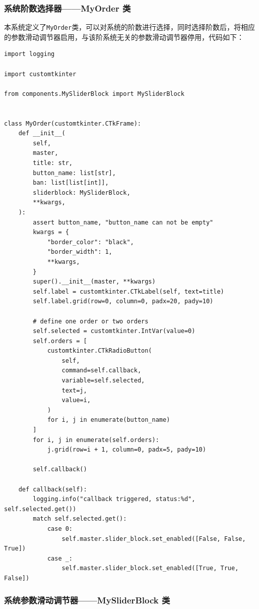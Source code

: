 \documentclass[12pt]{ctexart}
\begin{document}
\subsubsection{系统阶数选择器——MyOrder 类}

本系统定义了\texttt{MyOrder}类，可以对系统的阶数进行选择，同时选择阶数后，将相应的参数滑动调节器启用，与该阶系统无关的参数滑动调节器停用，代码如下：

\begin{lstlisting}[title=MyOrder 类代码]
import logging

import customtkinter

from components.MySliderBlock import MySliderBlock


class MyOrder(customtkinter.CTkFrame):
    def __init__(
        self,
        master,
        title: str,
        button_name: list[str],
        ban: list[list[int]],
        sliderblock: MySliderBlock,
        **kwargs,
    ):
        assert button_name, "button_name can not be empty"
        kwargs = {
            "border_color": "black",
            "border_width": 1,
            **kwargs,
        }
        super().__init__(master, **kwargs)
        self.label = customtkinter.CTkLabel(self, text=title)
        self.label.grid(row=0, column=0, padx=20, pady=10)

        # define one order or two orders
        self.selected = customtkinter.IntVar(value=0)
        self.orders = [
            customtkinter.CTkRadioButton(
                self,
                command=self.callback,
                variable=self.selected,
                text=j,
                value=i,
            )
            for i, j in enumerate(button_name)
        ]
        for i, j in enumerate(self.orders):
            j.grid(row=i + 1, column=0, padx=5, pady=10)

        self.callback()
 
    def callback(self):
        logging.info("callback triggered, status:%d", self.selected.get())
        match self.selected.get():
            case 0:
                self.master.slider_block.set_enabled([False, False, True])
            case _:
                self.master.slider_block.set_enabled([True, True, False])
\end{lstlisting}

\subsubsection{系统参数滑动调节器——MySliderBlock 类}
\end{document}
